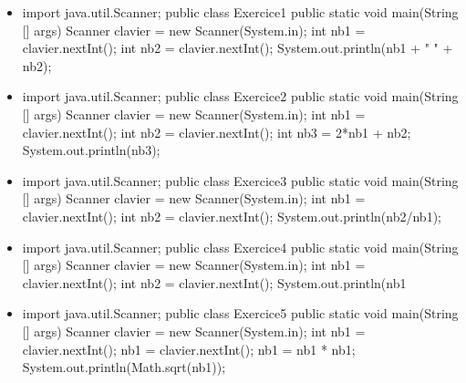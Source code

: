 \documentclass[11pt,a4paper]{article}
\begin{document}
					\begin{itemize}
				
			\item \begin{Java}
import java.util.Scanner;
public class Exercice1 {
    public static void main(String [] args) {
        Scanner clavier = new Scanner(System.in);
        int nb1 = clavier.nextInt();
        int nb2 = clavier.nextInt();
        System.out.println(nb1 + " " + nb2);
    }
}
        \end{Java} \textcolor{gray}{\underline{\hspace*{2em}}} 
			\item \begin{Java}
import java.util.Scanner;
public class Exercice2 {
    public static void main(String [] args) {
        Scanner clavier = new Scanner(System.in);
        int nb1 = clavier.nextInt();
        int nb2 = clavier.nextInt();
        int nb3 = 2*nb1 + nb2;
        System.out.println(nb3);
    }
}
									\end{Java}
			\item \begin{Java}
import java.util.Scanner;
public class Exercice3 {
    public static void main(String [] args) {
        Scanner clavier = new Scanner(System.in);
        int nb1 = clavier.nextInt();
        int nb2 = clavier.nextInt();
        System.out.println(nb2/nb1);
    }
}
        \end{Java} \textcolor{gray}{\underline{\hspace*{1em}}} 
			\item \begin{Java}
import java.util.Scanner;
public class Exercice4 {
    public static void main(String [] args) {
        Scanner clavier = new Scanner(System.in);
        int nb1 = clavier.nextInt();
        int nb2 = clavier.nextInt();
        System.out.println(nb1%
    }
}
        \end{Java} \textcolor{gray}{\underline{\hspace*{1em}}} 
			\item \begin{Java}
import java.util.Scanner;
public class Exercice5 {
    public static void main(String [] args) {
        Scanner clavier = new Scanner(System.in);
        int nb1 = clavier.nextInt();
        nb1 = clavier.nextInt();
        nb1 = nb1 * nb1;
        System.out.println(Math.sqrt(nb1));
    }
}
        \end{Java} \textcolor{gray}{\underline{\hspace*{1em}}} 
					\end{itemize}
				
\end{document}
